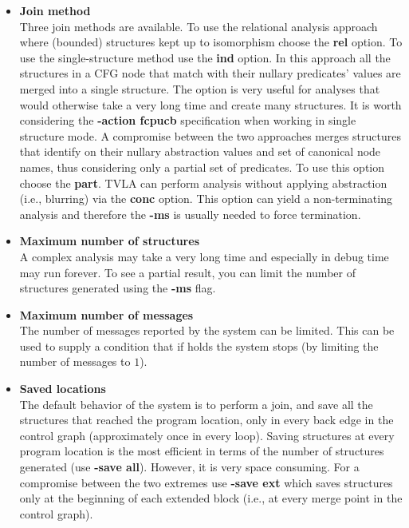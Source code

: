 \begin{itemize}
\item{\textbf{Join method}}\\
Three join methods are available. To use the relational analysis
approach where (bounded) structures kept up to isomorphism choose
the \textbf{rel} option. To use the single-structure method use
the \textbf{ind} option. In this approach all the structures in a
CFG node that match with their nullary predicates' values are
merged into a single structure. The option is very useful for
analyses that would otherwise take a very long time and create
many structures. It is worth considering the \textbf{-action
fcpucb} specification when working in single structure mode. A
compromise between the two approaches merges structures that
identify on their nullary abstraction values and set of canonical
node names, thus considering only a partial set of predicates. To
use this option choose the \textbf{part}.  TVLA can perform
analysis without applying abstraction (i.e., blurring) via the
\textbf{conc} option.  This option can yield a
non-terminating analysis and therefore the \textbf{-ms} is usually
needed to force termination.

\item{\textbf{Maximum number of structures}}\\
A complex analysis may take a very long time and especially in
debug time may run forever. To see a partial result, you can limit
the number of structures generated using the \textbf{-ms
} flag.

\item{\textbf{Maximum number of messages}}\\
The number of messages reported by the system can be limited. This
can be used to supply a condition that if holds the system stops
(by limiting the number of messages to $1$).

\item{\textbf{Saved locations}}\\
The default behavior of the system is to perform a join, and save
all the structures that reached the program location, only in
every back edge in the control graph (approximately once in every
loop). Saving structures at every program location is the most
efficient in terms of the number of structures generated (use
\textbf{-save all}). However, it is very space consuming. For a
compromise between the two extremes use \textbf{-save ext} which
saves structures only at the beginning of each extended block
(i.e., at every merge point in the control graph).


\end{itemize}
